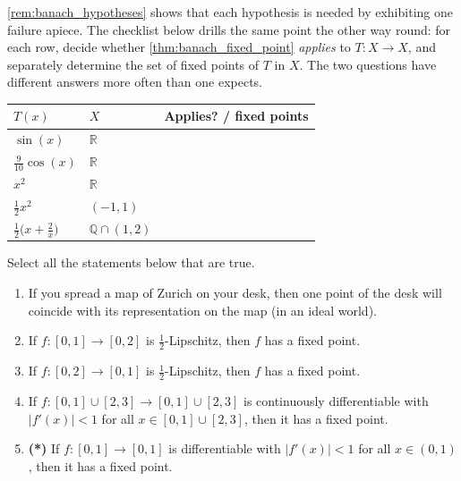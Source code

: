 \begin{exercise}
\label{ex:bfpt_applicability_table}
\cref{rem:banach_hypotheses} shows that each hypothesis is needed by exhibiting one failure
apiece. The checklist below drills the same point the other way round: for each row,
decide whether \cref{thm:banach_fixed_point} \emph{applies} to $T : X \to X$, and separately
determine the set of fixed points of $T$ in $X$. The two questions have different answers more
often than one expects.
\begin{center}
\begin{tabular}{lll}
\textbf{$T(x)$} & \textbf{$X$} & \textbf{Applies? / fixed points} \\
\hline
$\sin(x)$ & $\mathbb{R}$ & \\
$\tfrac{9}{10}\cos(x)$ & $\mathbb{R}$ & \\
$x^2$ & $\mathbb{R}$ & \\
$\tfrac12x^2$ & $(-1,1)$ & \\
$\tfrac12\big(x + \tfrac2x\big)$ & $\mathbb{Q}\cap(1,2)$ &
\end{tabular}
\end{center}
\end{exercise}




\begin{exercise}
\label{ex:fixed_points_multiple_choice}
Select all the statements below that are true.
\begin{enumerate}[label=\textbf{(\alph*)}]
  \item If you spread a map of Zurich on your desk, then one point of the desk will coincide with
    its representation on the map (in an ideal world).
  \item If $f : [0,1] \to [0,2]$ is $\tfrac{1}{2}$-Lipschitz, then $f$ has a fixed point.
  \item If $f : [0,2] \to [0,1]$ is $\tfrac{1}{2}$-Lipschitz, then $f$ has a fixed point.
  \item If $f : [0,1] \cup [2,3] \to [0,1] \cup [2,3]$ is continuously differentiable with
    $|f'(x)| < 1$ for all $x \in [0,1]\cup[2,3]$, then it has a fixed point.
  \item \textbf{(*)} If $f : [0,1] \to [0,1]$ is differentiable with $|f'(x)| < 1$ for all
    $x \in (0,1)$, then it has a fixed point.
\end{enumerate}
\end{exercise}

